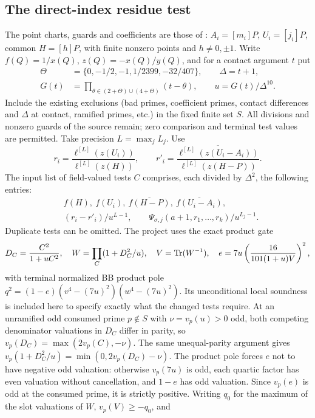 \documentclass[11pt]{article}
\begin{document}
\subsection{The direct-index residue test}
The point charts, guards and coefficients are those of \cite{index}:
$A_i=[m_i]P$, $U_i=[j_i]P$, common $H=[h]P$, with finite nonzero
points and $h\ne0,\pm1$. Write $f(Q)=1/x(Q)$, $z(Q)=-x(Q)/y(Q)$,
and for a contact argument $t$ put
\begin{align*}
 \Theta&=\{0,-1/2,-1,1/2399,-32/407\},\qquad
 \Delta=t+1,\\
 G(t)&=\prod_{\theta\in(2+\Theta)\cup(4+\Theta)}(t-\theta),\qquad u=G(t)/\Delta^{10}.
\end{align*}
Include the existing exclusions (bad primes, coefficient primes,
contact differences and $\Delta$ at contact, ramified primes, etc.)
in the fixed finite set $S$. All divisions and nonzero guards of the
source remain; zero comparison and terminal test values are permitted.
Take precision $L=\max_j L_j$. Use
\[
 r_i=\frac{\ell^{[L]}(z(U_i))}{\ell^{[L]}(z(H))},\qquad
 r'_i=\overline{\frac{\ell^{[L]}(z(U_i-A_i))}{\ell^{[L]}(z(H-P))}}.
\]
The input list of field-valued tests $C$ comprises, each divided by
$\Delta^2$, the following entries:
\begin{align*}
 &f(H),\ f(U_i),\ \overline{f(H-P)},\ \overline{f(U_i-A_i)},\\
 &(r_i-r'_i)/u^{L-1},\qquad
 \Psi_{\sigma,j}(a+1,r_1,\ldots,r_k)/u^{L_j-1}.
\end{align*}
Duplicate tests can be omitted. The project uses the exact product gate
\begin{equation}\label{eq:gate}
 D_C=\frac{C^2}{1+uC^2},\quad W=\prod_C(1+D_C^2/u),\quad V=\operatorname{Tr}(W^{-1}),\quad
 e=7u\left(\frac{16}{101(1+u)V}\right)^2,
\end{equation}
with terminal normalized BB product pole
$q^2=(1-e)(v^4-(7u)^2)(w^4-(7u)^2)$.
Its unconditional local soundness is included here to specify exactly
what the changed tests require. At an unramified odd consumed prime
$p\notin S$ with $\nu=v_p(u)>0$ odd, both competing denominator
valuations in $D_C$ differ in parity, so $v_p(D_C)=\max(2v_p(C),-\nu)$.
The same unequal-parity argument gives $v_p(1+D_C^2/u)=\min(0,2v_p(D_C)-\nu)$.
The product pole forces $e$ not to have negative odd valuation:
otherwise $v_p(7u)$ is odd, each quartic factor has even valuation
without cancellation, and $1-e$ has odd valuation. Since $v_p(e)$
is odd at the consumed prime, it is strictly positive. Writing $q_0$
for the maximum of the slot valuations of $W$, $v_p(V)\ge-q_0$, and
\end{document}
